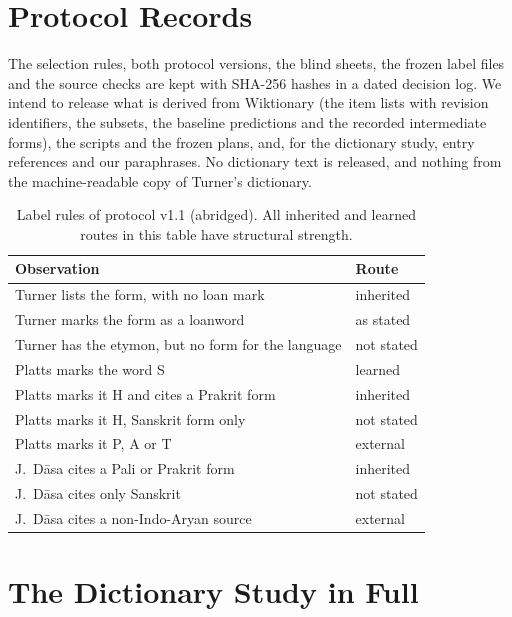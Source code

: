 \documentclass[11pt]{article}
\begin{document}


\appendix

\section{Protocol Records}
\label{app:records}

The selection rules, both protocol versions, the blind sheets, the frozen label files and the source checks are kept with SHA-256 hashes in a dated decision log. We intend to release what is derived from Wiktionary (the item lists with revision identifiers, the subsets, the baseline predictions and the recorded intermediate forms), the scripts and the frozen plans, and, for the dictionary study, entry references and our paraphrases. No dictionary text is released, and nothing from the machine-readable copy of Turner's dictionary.

\begin{table}[h]
\centering\small
\begin{tabular}{p{}p{}}
\toprule
\textbf{Observation} & \textbf{Route} \\
\midrule
Turner lists the form, with no loan mark & inherited \\
Turner marks the form as a loanword & as stated \\
Turner has the etymon, but no form for the language & not stated \\
Platts marks the word S & learned \\
Platts marks it H and cites a Prakrit form & inherited \\
Platts marks it H, Sanskrit form only & not stated \\
Platts marks it P, A or T & external \\
J.~D\=asa cites a Pali or Prakrit form & inherited \\
J.~D\=asa cites only Sanskrit & not stated \\
J.~D\=asa cites a non-Indo-Aryan source & external \\
\bottomrule
\end{tabular}
\caption{Label rules of protocol v1.1 (abridged). All inherited and learned routes in this table have structural strength.}
\label{tab:rules}
\end{table}

\section{The Dictionary Study in Full}
\label{sec:method}
\end{document}
